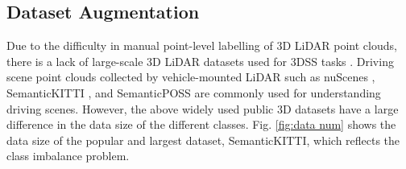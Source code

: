 \documentclass[journal]{IEEEtran}
\begin{document}
%
%
%
%
%

\subsection{Dataset Augmentation}
Due to the difficulty in manual point-level labelling of 3D LiDAR point clouds, there is a lack of large-scale 3D LiDAR datasets used for 3DSS tasks \cite{gao2021we}. 
Driving scene point clouds collected by vehicle-mounted LiDAR such as nuScenes \cite{caesar2019nuscenes}, SemanticKITTI \cite{behley2019semantickitti}, and SemanticPOSS \cite{pan2020semanticposs} are commonly used for understanding driving scenes. However, the above widely used public 3D datasets have a large difference in the data size of the different classes. Fig. \ref{fig:data num} shows the data size of the popular and largest dataset, SemanticKITTI, which  reflects the class imbalance problem.
\end{document}
